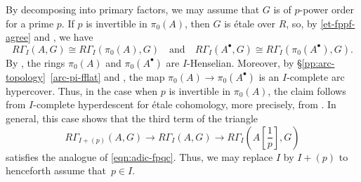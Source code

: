 \documentclass[11pt, reqno]{amsart}
\newcommand{\ra}{\rightarrow}
\providecommand{\f}[2]{\frac{#1}{#2}}
\providecommand{\qxq}[1]{\quad\text{#1}\quad}
\providecommand{\qx}[1]{\quad\text{#1}}
\newcommand{\tst}{\textstyle}
\numberwithin{equation}{numberingbase}
\theoremstyle{thms}
\theoremstyle{claims}
\theoremstyle{defs}
\theoremstyle{thms}
\theoremstyle{defs}
\theoremstyle{subsection-tweak}
\theoremstyle{subsection-tweak}
\begin{document}
By decomposing into primary factors, we may assume that $G$ is of $p$-power order for a prime $p$. If $p$ is invertible in $\pi_0(A)$, then $G$ is \'{e}tale over $R$, so, by \eqref{et-fppf-agree} and , we have
\[
R\Gamma_I(A, G) \cong R\Gamma_I(\pi_0(A), G) \qxq{and} R\Gamma_I(A^\bullet, G) \cong R\Gamma_I(\pi_0(A^\bullet), G). %
\]
By , the rings $\pi_0(A)$ and $\pi_0(A^\bullet)$ are $I$-Henselian. Moreover, by \S\ref{pp:arc-topology}~\ref{arc-pi-fflat} and , the map $\pi_0(A) \ra \pi_0(A^\bullet)$ is an $I$-complete arc hypercover. Thus, in the case when $p$ is invertible in $\pi_0(A)$, the claim follows from $I$-complete hyperdescent for \'{e}tale cohomology, more precisely, from . In general, this case shows that the third term of the triangle 
\[
\tst R\Gamma_{I + (p)}(A, G) \ra R\Gamma_I(A, G) \ra R\Gamma_I(A[\f1p], G)
\]
satisfies the analogue of \eqref{eqn:adic-fpqc}. Thus, we may replace $I$ by $I + (p)$ to henceforth assume that~$p \in I$. 
\end{document}
